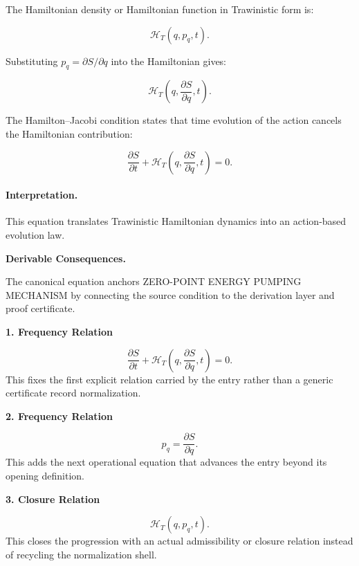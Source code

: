 The Hamiltonian density or Hamiltonian function in Trawinistic form is:

\begin{equation}
\mathcal{H}_T(q,p_q,t).
\end{equation}

Substituting $p_q=\partial S/\partial q$ into the Hamiltonian gives:

\begin{equation}
\mathcal{H}_T
\left(
q,\frac{\partial S}{\partial q},t
\right).
\end{equation}

The Hamilton--Jacobi condition states that time evolution of the action cancels the Hamiltonian contribution:

\begin{equation}
\boxed{
\frac{\partial S}{\partial t}
+
\mathcal{H}_T
\left(
q,\frac{\partial S}{\partial q},t
\right)
=
0 .
}
\end{equation}

\paragraph{Interpretation.}
This equation translates Trawinistic Hamiltonian dynamics into an action-based evolution law.

\par\vspace{0.35em}
\noindent\textbf{Derivable Consequences.}\quad
\begingroup
\footnotesize
\raggedright
The canonical equation anchors ZERO-POINT ENERGY PUMPING MECHANISM by connecting the source condition to the derivation layer and proof certificate.
\par\endgroup

\noindent\textbf{1. Frequency Relation}\par
\[
\frac{\partial S}{\partial t} + \mathcal{H}_T \left( q,\frac{\partial S}{\partial q},t \right) = 0.
\]
\noindent This fixes the first explicit relation carried by the entry rather than a generic certificate record normalization.\par
\noindent\textbf{2. Frequency Relation}\par
\[
p_q=\frac{\partial S}{\partial q}.
\]
\noindent This adds the next operational equation that advances the entry beyond its opening definition.\par
\noindent\textbf{3. Closure Relation}\par
\[
\mathcal{H}_T(q,p_q,t).
\]
\noindent This closes the progression with an actual admissibility or closure relation instead of recycling the normalization shell.\par

